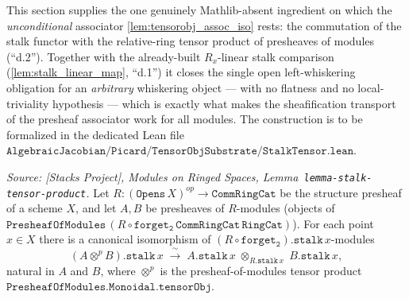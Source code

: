 This section supplies the one genuinely Mathlib-absent ingredient on which the
\emph{unconditional} associator \cref{lem:tensorobj_assoc_iso} rests: the commutation
of the stalk functor with the relative-ring tensor product of presheaves of modules
(``d.2''). Together with the already-built \(R_x\)-linear stalk comparison
(\cref{lem:stalk_linear_map}, ``d.1'') it closes the single open left-whiskering
obligation for an \emph{arbitrary} whiskering object --- with no flatness and no
local-triviality hypothesis --- which is exactly what makes the sheafification
transport of the presheaf associator work for all modules. The construction is to be
formalized in the dedicated Lean file
\(\mathtt{AlgebraicJacobian/Picard/TensorObjSubstrate/StalkTensor.lean}\).

\begin{lemma}\leanok
  \label{lem:stalk_tensor_commutation}
  \textit{Source: [Stacks Project], Modules on Ringed Spaces,
  Lemma~\texttt{lemma-stalk-tensor-product}.}
  Let \(R : (\mathtt{Opens}\,X)^{op} \to \mathtt{CommRingCat}\) be the structure
  presheaf of a scheme \(X\), and let \(A, B\) be presheaves of
  \(R\)-modules (objects of \(\mathtt{PresheafOfModules}\,(R \circ
  \mathtt{forget_2}\,\mathtt{CommRingCat}\,\mathtt{RingCat})\)). For each point
  \(x \in X\) there is a canonical isomorphism of \((R \circ
  \mathtt{forget_2}).\mathtt{stalk}\,x\)-modules
  \[
    (A \otimes^{p} B).\mathtt{stalk}\,x
      \;\xrightarrow{\ \sim\ }\;
    A.\mathtt{stalk}\,x \;\otimes_{R.\mathtt{stalk}\,x}\; B.\mathtt{stalk}\,x,
  \]
  natural in \(A\) and \(B\), where \(\otimes^{p}\) is the presheaf-of-modules tensor
  product \(\mathtt{PresheafOfModules.Monoidal.tensorObj}\).
\end{lemma}

